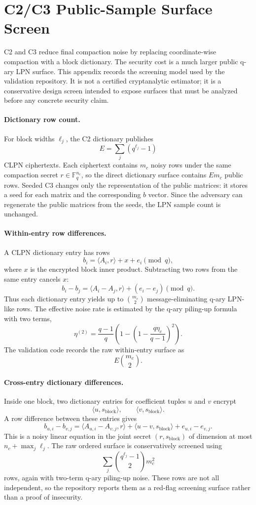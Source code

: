 \section{C2/C3 Public-Sample Surface Screen}
\label{app:c2-public-surface}

C2 and C3 reduce final compaction noise by replacing coordinate-wise compaction with a block dictionary.  The security cost is a much larger public q-ary LPN surface.  This appendix records the screening model used by the validation repository.  It is not a certified cryptanalytic estimator; it is a conservative design screen intended to expose surfaces that must be analyzed before any concrete security claim.

\paragraph{Dictionary row count.}
For block widths $\ell_j$, the C2 dictionary publishes
\[
  E = \sum_j (q^{\ell_j}-1)
\]
CLPN ciphertexts.  Each ciphertext contains $m_c$ noisy rows under the same compaction secret $r\in\mathbb F_q^{n_c}$, so the direct dictionary surface contains $E m_c$ public rows.  Seeded C3 changes only the representation of the public matrices: it stores a seed for each matrix and the corresponding $b$ vector.  Since the adversary can regenerate the public matrices from the seeds, the LPN sample count is unchanged.

\paragraph{Within-entry row differences.}
A CLPN dictionary entry has rows
\[
  b_i = \langle A_i,r\rangle + x + e_i \pmod q,
\]
where $x$ is the encrypted block inner product.  Subtracting two rows from the same entry cancels $x$:
\[
  b_i-b_j = \langle A_i-A_j,r\rangle + (e_i-e_j) \pmod q.
\]
Thus each dictionary entry yields up to $\binom{m_c}{2}$ message-eliminating q-ary LPN-like rows.  The effective noise rate is estimated by the q-ary piling-up formula with two terms,
\[
  \eta^{(2)} = \frac{q-1}{q}\left(1-\left(1-\frac{q\eta_c}{q-1}\right)^2\right).
\]
The validation code records the raw within-entry surface as
\[
  E\binom{m_c}{2}.
\]

\paragraph{Cross-entry dictionary differences.}
Inside one block, two dictionary entries for coefficient tuples $u$ and $v$ encrypt
\[
  \langle u,s_{\mathrm{block}}\rangle,\qquad \langle v,s_{\mathrm{block}}\rangle.
\]
A row difference between these entries gives
\[
  b_{u,i}-b_{v,j}
  = \langle A_{u,i}-A_{v,j},r\rangle
  + \langle u-v,s_{\mathrm{block}}\rangle
  + e_{u,i}-e_{v,j}.
\]
This is a noisy linear equation in the joint secret $(r,s_{\mathrm{block}})$ of dimension at most $n_c+\max_j\ell_j$.  The raw ordered surface is conservatively screened using
\[
  \sum_j \binom{q^{\ell_j}-1}{2} m_c^2
\]
rows, again with two-term q-ary piling-up noise.  These rows are not all independent, so the repository reports them as a red-flag screening surface rather than a proof of insecurity.

